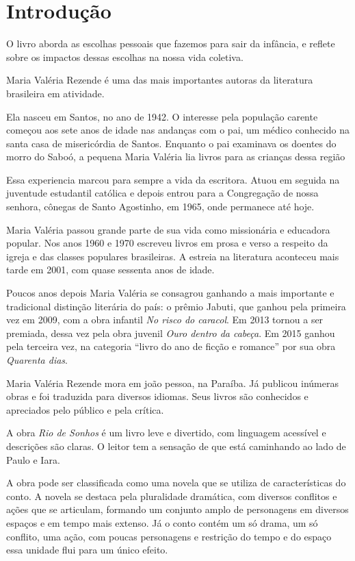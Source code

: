 \documentclass[12pt]{extarticle}
\begin{document}
\pagebreak\tableofcontents

\section{Introdução}

O livro aborda as escolhas pessoais  que fazemos para sair da infância, e 
reflete sobre os impactos dessas escolhas na nossa vida coletiva.  

Maria Valéria Rezende é uma das mais importantes autoras da literatura brasileira  em atividade.

Ela nasceu em Santos,  no ano de 1942. 
O interesse pela população carente  começou aos sete anos de idade  nas andanças com o pai,
um médico conhecido na santa casa de misericórdia de Santos. 
Enquanto o pai examinava os doentes do morro do Saboó,  a pequena Maria Valéria lia 
livros para as crianças dessa região 

Essa experiencia marcou para sempre a vida da escritora.
Atuou em seguida na juventude estudantil católica e depois entrou 
para a Congregação de nossa senhora, cônegas de Santo Agostinho,  
em 1965, onde permanece até hoje.

Maria Valéria  passou grande parte de sua vida como missionária e educadora popular.
Nos anos 1960 e 1970  escreveu livros em prosa e verso  a respeito da igreja e das classes populares brasileiras.  
A estreia na literatura aconteceu mais tarde  em 2001,  com quase sessenta anos de idade.

Poucos anos depois Maria Valéria se consagrou  ganhando a mais importante e tradicional distinção literária do país:  o prêmio Jabuti, que ganhou pela primeira vez em 2009,  com a obra infantil  \textit{No risco do caracol}. 
Em 2013  tornou a ser premiada,  dessa vez pela obra juvenil  \textit{Ouro dentro da cabeça}.
Em 2015 ganhou pela terceira vez, na categoria ``livro do ano de ficção e romance''  por sua obra 
\textit{Quarenta dias}.

Maria Valéria Rezende  mora em joão pessoa, na Paraíba. 
Já publicou inúmeras obras  e foi traduzida para diversos idiomas.
Seus livros são conhecidos  e apreciados pelo público  e pela crítica.

A obra \textit{Rio de Sonhos}
é um livro leve e divertido, com linguagem acessível e descrições são claras.
O leitor tem a sensação de que está caminhando ao lado de Paulo e Iara. 

A obra pode ser classificada como uma novela que se utiliza de características do conto. 
A novela  se destaca pela pluralidade dramática,  com diversos conflitos e ações que se articulam,  formando um conjunto amplo de personagens em diversos espaços e em tempo mais extenso.
Já o conto  contém um só drama,  um só conflito,  uma ação,  com poucas personagens e restrição do tempo e do espaço essa unidade flui para um único efeito.
\end{document}
